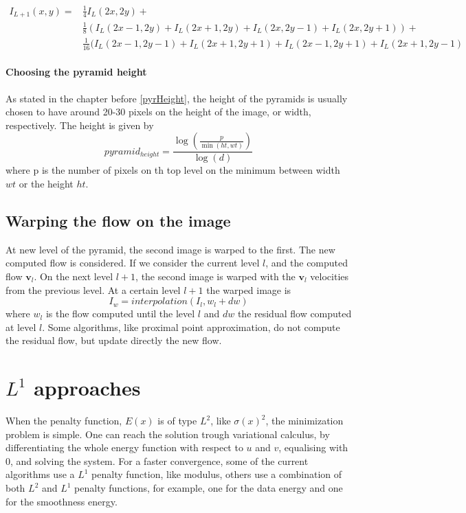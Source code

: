 \documentclass[12pt,a4paper,twoside]{report}
\begin{document}
\begin{equation} \label{eq1}
\begin{split}
I_{L+1}(x,y) = &\frac{1}{4}I_L(2x,2y)+\\
&\frac{1}{8}(I_L(2x-1,2y)+I_L(2x+1,2y)+I_L(2x,2y-1)+I_L(2x,2y+1))+\\
&\frac{1}{16}(I_L(2x-1,2y-1)+I_L(2x+1,2y+1)+I_L(2x-1,2y+1)+I_L(2x+1,2y-1) 
\end{split}
\end{equation}


\paragraph{Choosing the pyramid height}
As stated in the chapter before \ref{pyrHeight}, the height of the pyramids is usually chosen to have around 20-30 pixels on the height of the image, or width, respectively. The height is given by
\begin{equation}
	pyramid_{height} = \frac{\log\left(\frac{p}{\min(ht,wt)}\right)}
							{\log(d)}
\end{equation}
where p is the number of pixels on th top level on the minimum between  width $wt$ or the height $ht$.
\subsection{Warping the flow on the image}


At new level of the pyramid, the second image is warped to the first.
The new computed flow is considered.
If we consider the current level $l$, and the computed flow $\boldsymbol{v}_l$. On the next level $l+1$, the second image is warped with the $\boldsymbol{v}_l$ velocities from the previous level.
At a certain level $l+1$ the warped image is 
\begin{equation}
I_w = interpolation(I_l, w_l+dw)
\end{equation}
where $w_l$ is the flow computed until the level $l$ and $dw$ the  residual flow computed at level $l$. Some algorithms, like proximal point approximation, do not compute the residual flow, but update directly the new flow.

\section{$L^1$ approaches}

When the penalty function, $E(x)$ is of type $L^2$, like $\sigma(x)^2$,  the minimization problem is simple. One can reach the solution trough variational calculus, by differentiating the whole energy function with respect to $u$ and $v$, equalising with 0, and solving the system.  
For a faster convergence, some of the current algorithms use a $L^1$ penalty function, like modulus, others use a combination of both $L^2$ and $L^1$ penalty functions, for example, one for the data energy and one for the smoothness energy.
\end{document}
